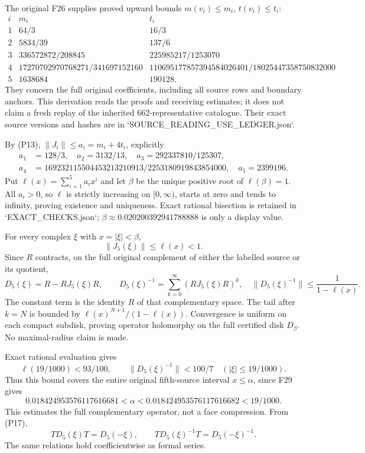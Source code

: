 \documentclass[11pt]{article}
\begin{document}
The original F26 supplies proved upward bounds \(m(v_i)\le m_i\), \(t(v_i)\le t_i\):
\[
\begin{array}{c|cc}
i&m_i&t_i\\\hline
1&64/3&16/3\\
2&5834/39&137/6\\
3&336572872/208845&225985217/1253070\\
4&17270702970768271/341697152160&110695177857394584026401/18025447358750832000\\
5&1638684&190128 .
\end{array}\tag{P18}
\]
They concern the full original coefficients, including all source rows and boundary anchors. This derivation reads the proofs and receiving estimates; it does not claim a fresh replay of the inherited 662-representative catalogue. Their exact source versions and hashes are in `SOURCE\_READING\_USE\_LEDGER.json`.

By (P13), \(\|J_i\|\le a_i=m_i+4t_i\), explicitly
\[
\begin{aligned}
a_1&=128/3,\quad a_2=3132/13,\quad a_3=292337810/125307,\\
a_4&=169232115504453213210913/2253180919843854000,\quad
a_5=2399196.
\end{aligned}\tag{P19}
\]
Put \(\ell(x)=\sum_{i=1}^5a_ix^i\) and let \(\beta\) be the unique positive root of \(\ell(\beta)=1\). All \(a_i>0\), so \(\ell\) is strictly increasing on \([0,\infty)\), starts at zero and tends to infinity, proving existence and uniqueness. Exact rational bisection is retained in `EXACT\_CHECKS.json`; \(\beta\approx0.020200392941788888\) is only a display value.

For every complex \(\xi\) with \(x=|\xi|<\beta\),
\[
 \|J_5(\xi)\|\le\ell(x)<1.
\]
Since \(R\) contracts, on the full original complement of either the labelled source or its quotient,
\[
 D_5(\xi)=R-RJ_5(\xi)R,\qquad
 \boxed{D_5(\xi)^{-1}=\sum_{k=0}^\infty(RJ_5(\xi)R)^k,\quad
 \|D_5(\xi)^{-1}\|\le\frac1{1-\ell(x)}.} \tag{P20}
\]
The constant term is the identity \(R\) of that complementary space. The tail after \(k=N\) is bounded by \(\ell(x)^{N+1}/(1-\ell(x))\). Convergence is uniform on each compact subdisk, proving operator holomorphy on the full certified disk \(D_\beta\). No maximal-radius claim is made.

Exact rational evaluation gives
\[
 \ell(19/1000)<93/100,\qquad
 \|D_5(\xi)^{-1}\|<100/7\quad(|\xi|\le19/1000). \tag{P21}
\]
Thus this bound covers the entire original fifth-source interval \(x\le\alpha\), since F29 gives
\[
 0.018424953576117616681<\alpha
 <0.018424953576117616682<19/1000 .
\]
This estimates the full complementary operator, not a face compression. From (P17),
\[
 TD_5(\xi)T=D_5(-\xi),\qquad
 TD_5(\xi)^{-1}T=D_5(-\xi)^{-1}. \tag{P22}
\]
The same relations hold coefficientwise as formal series.
\end{document}
